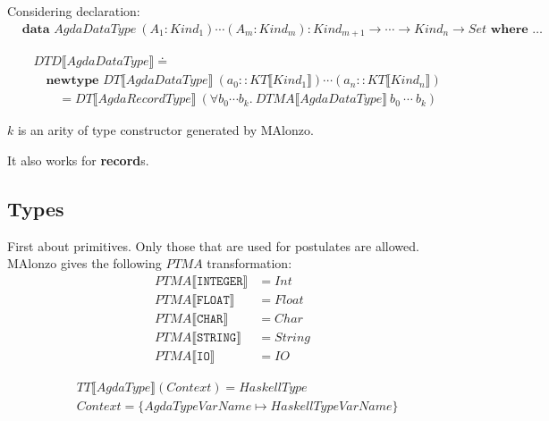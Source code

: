 Considering declaration:
\begin{align*}
   &\textbf{data } AgdaDataType\ (A_1 : Kind_1) \cdots (A_m : Kind_m) :
      Kind_{m+1} \rightarrow \cdots \rightarrow Kind_n \rightarrow Set \textbf{ where } \ldots
\end{align*}

\begin{align*}
   &DTD\llbracket AgdaDataType \rrbracket \doteq\\
   &\quad\textbf{newtype } DT\llbracket AgdaDataType \rrbracket\ (a_0 :: KT\llbracket Kind_1 \rrbracket)
      \cdots (a_n :: KT\llbracket Kind_n \rrbracket)\\
   &\quad\quad = DT\llbracket AgdaRecordType \rrbracket\ (\forall b_0 \cdots b_k.\ DTMA\llbracket AgdaDataType \rrbracket\ b_0\ \cdots\ b_k)
\end{align*}

\(k\) is an arity of type constructor generated by MAlonzo.

It also works for \textbf{record}s.

\subsection{Types}

First about primitives. Only those that are used for postulates are allowed.
MAlonzo gives the following \(PTMA\) transformation:
\begin{align*}
   PTMA\llbracket \texttt{INTEGER} \rrbracket &= Int\\
   PTMA\llbracket \texttt{FLOAT} \rrbracket &= Float\\
   PTMA\llbracket \texttt{CHAR} \rrbracket &= Char\\
   PTMA\llbracket \texttt{STRING} \rrbracket &= String\\
   PTMA\llbracket \texttt{IO} \rrbracket &= IO
\end{align*}

\begin{align*}
   &TT\llbracket AgdaType \rrbracket(Context) = HaskellType\\
   &Context = \{ AgdaTypeVarName \mapsto HaskellTypeVarName \}
\end{align*}


